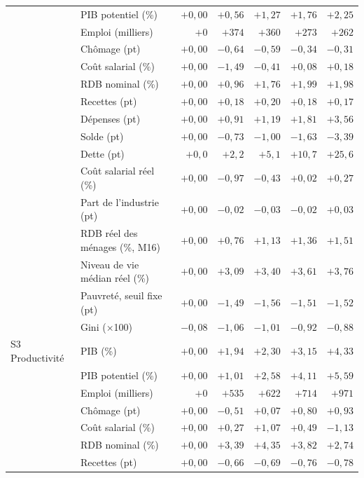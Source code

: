\begin{longtable}{llrrrrr}
 & PIB potentiel (\%) & $+0{,}00$ & $+0{,}56$ & $+1{,}27$ & $+1{,}76$ & $+2{,}25$\\
 & Emploi (milliers) & $+0$ & $+374$ & $+360$ & $+273$ & $+262$\\
 & Chômage (pt) & $+0{,}00$ & $-0{,}64$ & $-0{,}59$ & $-0{,}34$ & $-0{,}31$\\
 & Coût salarial (\%) & $+0{,}00$ & $-1{,}49$ & $-0{,}41$ & $+0{,}08$ & $+0{,}18$\\
 & RDB nominal (\%) & $+0{,}00$ & $+0{,}96$ & $+1{,}76$ & $+1{,}99$ & $+1{,}98$\\
 & Recettes (pt) & $+0{,}00$ & $+0{,}18$ & $+0{,}20$ & $+0{,}18$ & $+0{,}17$\\
 & Dépenses (pt) & $+0{,}00$ & $+0{,}91$ & $+1{,}19$ & $+1{,}81$ & $+3{,}56$\\
 & Solde (pt) & $+0{,}00$ & $-0{,}73$ & $-1{,}00$ & $-1{,}63$ & $-3{,}39$\\
 & Dette (pt) & $+0{,}0$ & $+2{,}2$ & $+5{,}1$ & $+10{,}7$ & $+25{,}6$\\
 & Coût salarial réel (\%) & $+0{,}00$ & $-0{,}97$ & $-0{,}43$ & $+0{,}02$ & $+0{,}27$\\
 & Part de l'industrie (pt) & $+0{,}00$ & $-0{,}02$ & $-0{,}03$ & $-0{,}02$ & $+0{,}03$\\
 & RDB réel des ménages (\%, M16) & $+0{,}00$ & $+0{,}76$ & $+1{,}13$ & $+1{,}36$ & $+1{,}51$\\
 & Niveau de vie médian réel (\%) & $+0{,}00$ & $+3{,}09$ & $+3{,}40$ & $+3{,}61$ & $+3{,}76$\\
 & Pauvreté, seuil fixe (pt) & $+0{,}00$ & $-1{,}49$ & $-1{,}56$ & $-1{,}51$ & $-1{,}52$\\
 & Gini (×100) & $-0{,}08$ & $-1{,}06$ & $-1{,}01$ & $-0{,}92$ & $-0{,}88$\\
\addlinespace
S3 Productivité & PIB (\%) & $+0{,}00$ & $+1{,}94$ & $+2{,}30$ & $+3{,}15$ & $+4{,}33$\\
 & PIB potentiel (\%) & $+0{,}00$ & $+1{,}01$ & $+2{,}58$ & $+4{,}11$ & $+5{,}59$\\
 & Emploi (milliers) & $+0$ & $+535$ & $+622$ & $+714$ & $+971$\\
 & Chômage (pt) & $+0{,}00$ & $-0{,}51$ & $+0{,}07$ & $+0{,}80$ & $+0{,}93$\\
 & Coût salarial (\%) & $+0{,}00$ & $+0{,}27$ & $+1{,}07$ & $+0{,}49$ & $-1{,}13$\\
 & RDB nominal (\%) & $+0{,}00$ & $+3{,}39$ & $+4{,}35$ & $+3{,}82$ & $+2{,}74$\\
 & Recettes (pt) & $+0{,}00$ & $-0{,}66$ & $-0{,}69$ & $-0{,}76$ & $-0{,}78$\\

\end{longtable}
